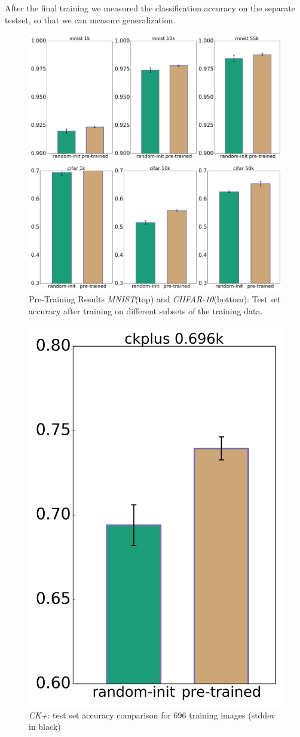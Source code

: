 \documentclass[draft]{article}
\begin{document}
    After the final training we measured the classification accuracy on the separate testset, so that we can measure generalization.
    \begin{figure}
      \centering

      \includegraphics[width=.8\linewidth]{../box_plots/boxplots_mnist.png}

      \includegraphics[width=.8\linewidth]{../box_plots/boxplots_cifar.png}

      \caption{Pre-Training Results \emph{MNIST}(top) and \emph{CIIFAR-10}(bottom): Test set accuracy after training on different subsets of the training data.}
      \label{fig:mnist_cifar_plot}
    \end{figure}


    \begin{figure}
      \centering
      \includegraphics[width=0.33\linewidth]{../box_plots/boxplots_ckplus.png}
      \caption{\emph{CK+}: test set accuracy comparison for 696 training images (stddev in black)}
      \label{fig:ckplus_plot}
    \end{figure}
\end{document}
